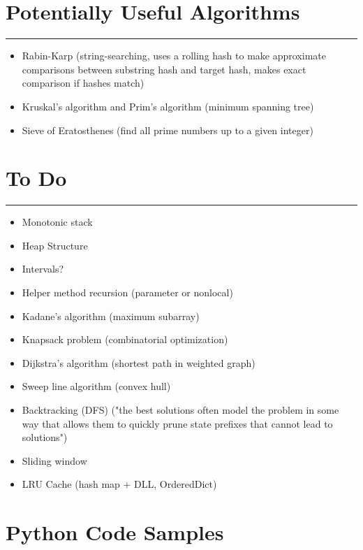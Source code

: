 \documentclass[12pt]{article}
\begin{document}
\section*{Potentially Useful Algorithms}
\hrule\vspace{5ex}

\begin{itemize}
  \item Rabin-Karp (string-searching, uses a rolling hash to make approximate comparisons between substring hash and target hash, makes exact comparison if hashes match)
  \item Kruskal's algorithm and Prim's algorithm (minimum spanning tree)
  \item Sieve of Eratosthenes (find all prime numbers up to a given integer)
\end{itemize}

\section*{To Do}
\hrule\vspace{5ex}

\begin{itemize}
  \item {\color{red} Monotonic stack}
  \item {\color{red} Heap Structure}
  \item {\color{red} Intervals?}
  \item Helper method recursion (parameter or nonlocal)
  \item Kadane's algorithm (maximum subarray)
  \item Knapsack problem (combinatorial optimization)
  \item Dijkstra's algorithm (shortest path in weighted graph)
  \item Sweep line algorithm (convex hull)
  \item Backtracking (DFS) ("the best solutions often model the problem in some way that allows them to quickly prune state prefixes that cannot lead to solutions")
  \item Sliding window
  \item LRU Cache (hash map + DLL, OrderedDict)
\end{itemize}

\appendix

\section{Python Code Samples}
\end{document}
